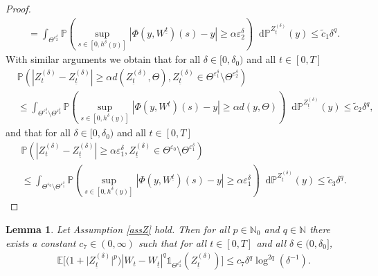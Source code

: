\documentclass[11pt,a4paper]{article}
\numberwithin{equation}{section}
\newtheorem{lemma}[theorem]{Lemma}
\theoremstyle{definition}
\newcommand{\E}{{\mathbb{E}}}
\newcommand{\N}{{\mathbb{N}}}
\renewcommand{\P}{{\mathbb{P}}}
\newcommand{\diff}{\mathop{}\!\mathrm{d}}
\begin{document}
\begin{proof}
\begin{equation}
\begin{aligned}
            &= \int_{\Theta^{\varepsilon_2^\delta}} \P(\sup_{s\in[0,h^{\delta}(y)]} | \Phi(y,W^{\underline{t}})(s) - y| \geq \alpha \varepsilon_2^\delta) \diff \P^{Z^{(\delta)}_{\underline{t}}} (y)
            \leq \widetilde c_1 \delta^q.
        \end{aligned}        
    \end{equation}
    With similar arguments we obtain that for all $\delta\in[0,\delta_0)$ and all $t\in[0,T]$
    \begin{equation}
        \begin{aligned}
            &\P(|Z^{(\delta)}_{t} -Z^{(\delta)}_{\underline{t}} | \geq \alpha d( Z^{(\delta)}_{\underline{t}},\Theta),  Z^{(\delta)}_{\underline{t}} \in \Theta^{\varepsilon_1^\delta}\setminus \Theta^{\varepsilon_2^\delta})\\
            & \leq \int_{\Theta^{\varepsilon_1^\delta}\setminus \Theta^{\varepsilon_2^\delta}} \P(\sup_{s\in[0,h^{\delta}(y)]} | \Phi(y,W^{\underline{t}})(s) - y| \geq \alpha d( y,\Theta) ) \diff \P^{Z^{(\delta)}_{\underline{t}}} (y)
            \leq \widetilde c_2 \delta^q,
        \end{aligned}        
    \end{equation}
    and that for all $\delta\in[0,\delta_0)$ and all $t\in[0,T]$
    \begin{equation}
        \begin{aligned}
            &\P(|Z^{(\delta)}_{t} -Z^{(\delta)}_{\underline{t}} | \geq \alpha\varepsilon_1^\delta,   Z^{(\delta)}_{\underline{t}} \in \Theta^{\varepsilon_0}\setminus \Theta^{\varepsilon_1^\delta})\\
            & \leq \int_{\Theta^{\varepsilon_0}\setminus \Theta^{\varepsilon_1^\delta}} \P(\sup_{s\in[0,h^{\delta}(y)]} | \Phi(y,W^{\underline{t}})(s) - y| \geq \alpha \varepsilon_1^\delta ) \diff \P^{Z^{(\delta)}_{\underline{t}}} (y)
            \leq \widetilde c_3 \delta^q.
        \end{aligned}        
    \end{equation}
\end{proof}

\begin{lemma}\label{MWwithInd}
    Let Assumption \ref{assZ} hold. Then for all $p\in\N_0$ and  $q\in\N$ there exists a constant $c_7\in(0,\infty)$ such that for all $t\in[0,T]$ and all $\delta \in(0,\delta_0]$, 
    \begin{equation}\label{MWwithIndeq}
        \begin{aligned}
        &\E\Big[ \big(1+ \big|Z^{(\delta)}_{\underline{t}}\big|^p\big)   |W_t-W_{\underline{t}}|^q \mathds{1}_{\Theta^{\varepsilon_2^\delta}}(Z_{\underline t}^{(\delta)})\Big]
        \leq c_7  \delta^q \log^{2q}(\delta^{-1}).
        \end{aligned}
    \end{equation}
\end{lemma}
\end{document}
